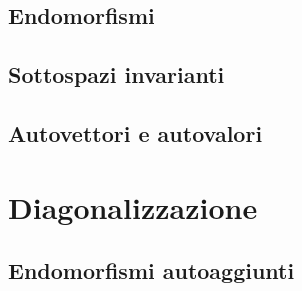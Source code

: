 \documentclass[x11names]{article}
\begin{document}
\subsection{Endomorfismi}
\subsection{Sottospazi invarianti}

\subsection{Autovettori e autovalori}




\section{Diagonalizzazione}
\subsection{Endomorfismi autoaggiunti}
\end{document}
